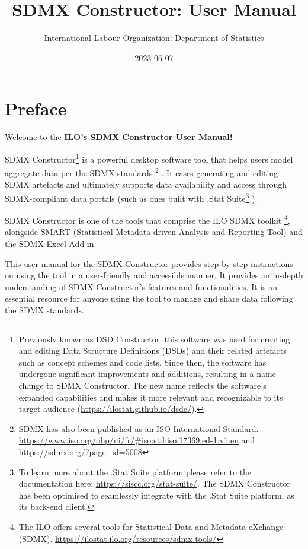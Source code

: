 \documentclass[
]{book}
\title{SDMX Constructor: User Manual}
\author{International Labour Organization: Department of Statistics}
\date{2023-06-07}
\begin{document}
\maketitle

{
\setcounter{tocdepth}{1}
\tableofcontents
}
\hypertarget{preface}{%
\chapter*{Preface}\label{preface}}

Welcome to the \textbf{ILO's SDMX Constructor User Manual!}

SDMX Constructor\footnote{Previously known as DSD Constructor, this software was used for creating and editing Data Structure Definitions (DSDs) and their related artefacts such as concept schemes and code lists. Since then, the software has undergone significant improvements and additions, resulting in a name change to SDMX Constructor. The new name reflects the software's expanded capabilities and makes it more relevant and recognizable to its target audience (\url{https://ilostat.github.io/dsdc/}).} is a powerful desktop software tool that helps users model aggregate data per the SDMX standards \footnote{SDMX has also been published as an ISO International Standard. \url{https://www.iso.org/obp/ui/fr/\#iso:std:iso:17369:ed-1:v1:en} and \url{https://sdmx.org/?page_id=5008}} . It eases generating and editing SDMX artefacts and ultimately supports data availability and access through SDMX-compliant data portals (such as ones built with .Stat Suite\footnote{To learn more about the .Stat Suite platform please refer to the documentation here: \url{https://siscc.org/stat-suite/}. The SDMX Constructor has been optimised to seamlessly integrate with the .Stat Suite platform, as its back-end client.} ).

SDMX Constructor is one of the tools that comprise the ILO SDMX toolkit \footnote{The ILO offers several tools for Statistical Data and Metadata eXchange (SDMX). \url{https://ilostat.ilo.org/resources/sdmx-tools/}}, alongside SMART (Statistical Metadata-driven Analysis and Reporting Tool) and the SDMX Excel Add-in.

This user manual for the SDMX Constructor provides step-by-step instructions on using the tool in a user-friendly and accessible manner. It provides an in-depth understanding of SDMX Constructor's features and functionalities. It is an essential resource for anyone using the tool to manage and share data following the SDMX standards.
\end{document}

